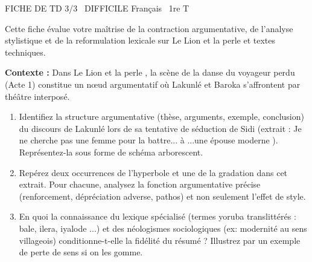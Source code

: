 \documentclass[11pt]{article}
\begin{document}
\begin{tcolorbox}[enhanced,colback=popink,colframe=popink,arc=10pt,boxrule=0pt,left=12pt,right=12pt,top=9pt,bottom=9pt]
{\color{white}\popxbold\small FICHE DE TD 3/3 \textbullet\ DIFFICILE \hfill Français \textbullet\ 1re T\par}
\end{tcolorbox}
\vspace{4pt}
Cette fiche évalue votre maîtrise de la contraction argumentative, de l'analyse stylistique et de la reformulation lexicale sur \og Le Lion et la perle \fg{} et textes techniques.

\begin{exercice}
\textbf{Contexte :} Dans \og Le Lion et la perle \fg{}, la scène de la \og danse du voyageur perdu \fg{} (Acte 1) constitue un nœud argumentatif où Lakunlé et Baroka s'affrontent par théâtre interposé.
\begin{enumerate}
    \item Identifiez la structure argumentative (thèse, arguments, exemple, conclusion) du discours de Lakunlé lors de sa tentative de séduction de Sidi (extrait : \og Je ne cherche pas une femme pour la battre...\fg{} à \og ...une épouse moderne \fg{}). Représentez-la sous forme de schéma arborescent.
    \item Repérez deux occurrences de l'hyperbole et une de la gradation dans cet extrait. Pour chacune, analysez la fonction argumentative précise (renforcement, dépréciation adverse, pathos) et non seulement l'effet de style.
    \item En quoi la connaissance du lexique spécialisé (termes yoruba translittérés : \og bale, ilera, iyalode \fg{}...) et des néologismes sociologiques (ex: \og modernité \fg{} au sens villageois) conditionne-t-elle la fidélité du résumé ? Illustrez par un exemple de perte de sens si on les gomme.
\end{enumerate}
\end{exercice}
\end{document}
